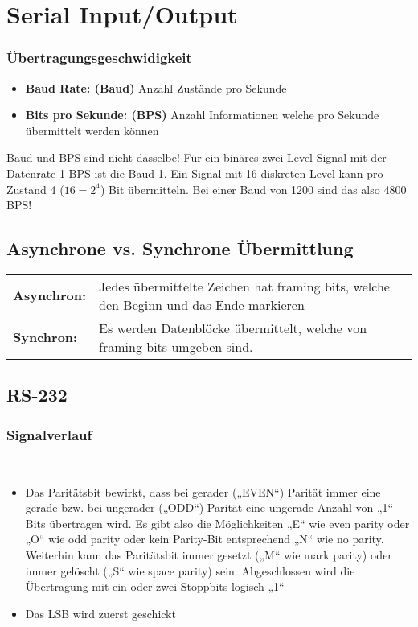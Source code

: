 \section{Serial Input/Output}

\subsubsection{Übertragungsgeschwidigkeit}
\begin{itemize}
  \item \textbf{Baud Rate: (Baud)} Anzahl Zustände pro Sekunde
  \item \textbf{Bits pro Sekunde: (BPS)} Anzahl Informationen welche pro Sekunde übermittelt werden können
\end{itemize}
Baud und BPS sind nicht dasselbe! Für ein binäres zwei-Level Signal mit der Datenrate 1 BPS ist die Baud 1.
Ein Signal mit 16 diskreten Level kann pro Zustand 4 ($16=2^4$) Bit übermitteln. Bei einer Baud von 1200 sind das also 4800 BPS! 

\subsection{Asynchrone vs. Synchrone Übermittlung}
\begin{tabular}{ll}
	\textbf{Asynchron:}	& Jedes übermittelte Zeichen hat framing bits, welche den Beginn und das Ende markieren \\
	\textbf{Synchron:}	& Es werden Datenblöcke übermittelt, welche von framing	bits umgeben sind.
\end{tabular}

\subsection{RS-232}
\subsubsection{Signalverlauf}
	\\
  \begin{itemize}
    \item Das Paritätsbit bewirkt, dass bei gerader („EVEN“) Parität immer eine
    gerade bzw. bei ungerader („ODD“) Parität eine ungerade Anzahl von „1“-Bits übertragen wird. Es gibt also die Möglichkeiten „E“ wie even parity oder „O“ wie odd parity oder kein Parity-Bit entsprechend „N“ wie no parity. Weiterhin kann das Paritätsbit immer gesetzt („M“ wie mark parity) oder immer gelöscht („S“ wie space parity) sein. Abgeschlossen wird die Übertragung mit ein oder zwei Stoppbits logisch „1“
    \item Das LSB wird zuerst geschickt
  \end{itemize}

